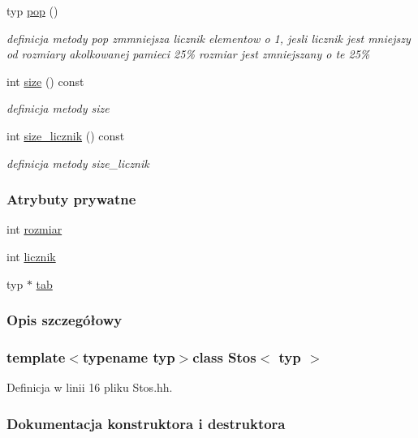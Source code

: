 \begin{DoxyCompactItemize}
typ \hyperlink{class_stos_a779da9dd1daf1118cd4b213401a4e1ed}{pop} ()
\begin{DoxyCompactList}\small\item\em definicja metody pop zmmniejsza licznik elementow o 1, jesli licznik jest mniejszy od rozmiary akolkowanej pamieci 25\% rozmiar jest zmniejszany o te 25\% \end{DoxyCompactList}\item 
int \hyperlink{class_stos_aedf6a4f76e7f0bce073a21be4db7163c}{size} () const 
\begin{DoxyCompactList}\small\item\em definicja metody size \end{DoxyCompactList}\item 
int \hyperlink{class_stos_af80c453627a2d250c1af6a533271faf1}{size\+\_\+licznik} () const 
\begin{DoxyCompactList}\small\item\em definicja metody size\+\_\+licznik \end{DoxyCompactList}\end{DoxyCompactItemize}
\subsubsection*{Atrybuty prywatne}
\begin{DoxyCompactItemize}
\item 
int \hyperlink{class_stos_a66c92dc47edd280d9ea15fbcafcd9a80}{rozmiar}
\item 
int \hyperlink{class_stos_a6c59f21dc384c9dfdbae5343446c704f}{licznik}
\item 
typ $\ast$ \hyperlink{class_stos_acb9c6baeb0616796d20cfd05f6457fe3}{tab}
\end{DoxyCompactItemize}


\subsubsection{Opis szczegółowy}
\subsubsection*{template$<$typename typ$>$class Stos$<$ typ $>$}



Definicja w linii 16 pliku Stos.\+hh.



\subsubsection{Dokumentacja konstruktora i destruktora}
\hypertarget{class_stos_af6c53f2458ebd95fd992a14fef6712d0}{}
